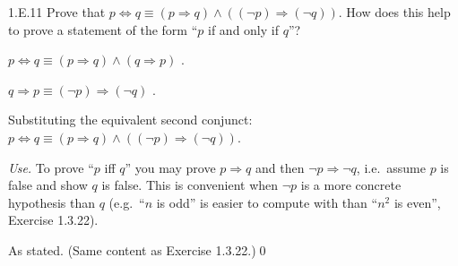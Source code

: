 
\begin{bookex}[recommended]{1.E.11}
Prove that $p\Leftrightarrow q\equiv(p\Rightarrow q)\wedge((\neg p)\Rightarrow(\neg q))$. How does this help to prove a statement of the form ``$p$ if and only if $q$''?
\solution
\begin{steps}
\item $p\Leftrightarrow q\equiv(p\Rightarrow q)\wedge(q\Rightarrow p)$ .
\item $q\Rightarrow p\equiv(\neg p)\Rightarrow(\neg q)$ .
\item Substituting the equivalent second conjunct: $p\Leftrightarrow q\equiv(p\Rightarrow q)\wedge((\neg p)\Rightarrow(\neg q))$.
\item \emph{Use.} To prove ``$p$ iff $q$'' you may prove $p\Rightarrow q$ and then $\neg p\Rightarrow\neg q$, i.e.\ assume $p$ is false and show $q$ is false. This is convenient when $\neg p$ is a more concrete hypothesis than $q$ (e.g.\ ``$n$ is odd'' is easier to compute with than ``$n^2$ is even'', Exercise 1.3.22).
\end{steps}
\conclusion As stated. (Same content as Exercise 1.3.22.)\qed
\end{bookex}

